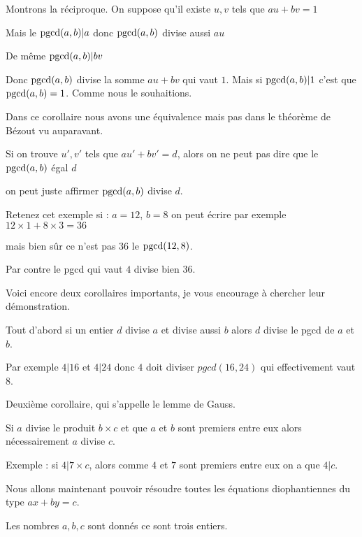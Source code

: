 Montrons la réciproque. On suppose qu'il existe $u,v$ tels que $au+bv=1$

Mais le  $\mathop{\mathrm{pgcd}}\nolimits(a,b)|a$ donc $\mathop{\mathrm{pgcd}}\nolimits(a,b)$ divise aussi $au$

De même $\mathop{\mathrm{pgcd}}\nolimits(a,b)|bv$

Donc $\mathop{\mathrm{pgcd}}\nolimits(a,b)$ divise la somme $au+bv$ qui vaut $1$. Mais si  $\mathop{\mathrm{pgcd}}\nolimits(a,b)|1$
c'est que $\mathop{\mathrm{pgcd}}\nolimits(a,b)=1$. Comme nous le souhaitions.

\change

Dans ce corollaire nous avons une équivalence mais pas dans le théorème de Bézout 
vu auparavant. 

Si on trouve $u',v'$ tels que $au'+bv'=d$, 
alors on ne peut pas dire que le $\mathop{\mathrm{pgcd}}\nolimits(a,b)$ égal $d$ 

on peut juste affirmer $\mathop{\mathrm{pgcd}}\nolimits(a,b)$ divise $d$.

\change 

Retenez cet exemple si : $a=12$, $b=8$
on peut écrire par exemple  $12 \times 1 + 8 \times 3 = 36$ 

mais bien sûr ce n'est pas $36$ le $\mathop{\mathrm{pgcd}}\nolimits(12,8)$.

Par contre le pgcd qui vaut $4$ divise bien $36$.


\diapo

Voici encore deux corollaires importants,
je vous encourage à chercher leur démonstration.


Tout d'abord si un entier  $d$ divise $a$ et divise aussi $b$ alors $d$ divise le pgcd de $a$ et $b$.

\change

Par exemple $4|16$ et $4|24$ donc $4$ doit diviser $pgcd(16,24)$ qui effectivement vaut $8$.


\change

Deuxième corollaire, qui s'appelle le lemme de Gauss.

Si $a$ divise le produit $b\times c$ et que $a$ et $b$ sont premiers entre eux alors
nécessairement $a$ divise $c$.

\change

Exemple : si $4 | 7\times c$, alors comme $4$ et $7$ sont premiers entre eux on a que $4|c$.


\diapo

Nous allons maintenant pouvoir résoudre toutes les équations diophantiennes
du type $ax+by=c$. 

Les nombres $a,b, c$ sont donnés ce sont trois entiers.

